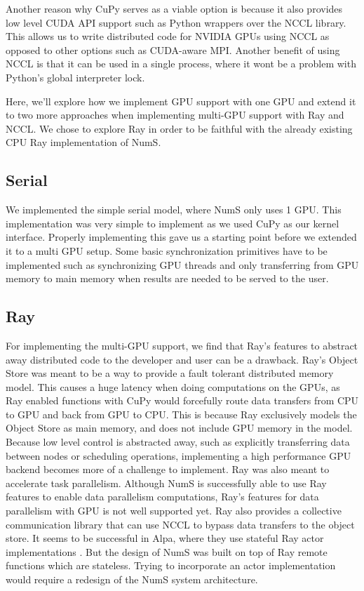 \documentclass{article}
\begin{document}
Another reason why CuPy serves as a viable option is because it also provides low level CUDA API support such as Python wrappers over the NCCL library. This allows us to write distributed code for NVIDIA GPUs using NCCL as opposed to other options such as CUDA-aware MPI. Another benefit of using NCCL is that it can be used in a single process, where it wont be a problem with Python's global interpreter lock.

Here, we'll explore how we implement GPU support with one GPU and extend it to two more approaches when implementing multi-GPU support with Ray and NCCL. We chose to explore Ray in order to be faithful with the already existing CPU Ray implementation of NumS.

\subsection{Serial}
We implemented the simple serial model, where NumS only uses 1 GPU. This implementation was very simple to implement as we used CuPy as our kernel interface. Properly implementing this gave us a starting point before we extended it to a multi GPU setup. Some basic synchronization primitives have to be implemented such as synchronizing GPU threads and only transferring from GPU memory to main memory when results are needed to be served to the user.

\subsection{Ray}
For implementing the multi-GPU support, we find that Ray's features to abstract away distributed code to the developer and user can be a drawback. Ray's Object Store was meant to be a way to provide a fault tolerant distributed memory model. \cite{ray} This causes a huge latency when doing computations on the GPUs, as Ray enabled functions with CuPy would forcefully route data transfers from CPU to GPU and back from GPU to CPU. This is because Ray exclusively models the Object Store as main memory, and does not include GPU memory in the model. Because low level control is abstracted away, such as explicitly transferring data between nodes or scheduling operations, implementing a high performance GPU backend becomes more of a challenge to implement. Ray was also meant to accelerate task parallelism. Although NumS is successfully able to use Ray features to enable data parallelism computations, Ray's features for data parallelism with GPU is not well supported yet. Ray also provides a collective communication library that can use NCCL to bypass data transfers to the object store. It seems to be successful in Alpa, where they use stateful Ray actor implementations \cite{alpa}. But the design of NumS was built on top of Ray remote functions which are stateless. Trying to incorporate an actor implementation would require a redesign of the NumS system architecture. 
\end{document}
